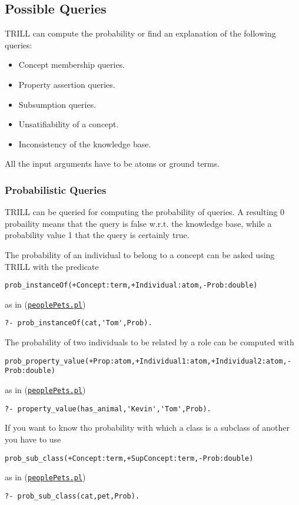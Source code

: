 \subsection{Possible Queries}
\label{queries}

TRILL can compute the probability or find an explanation of the following queries:
\begin{itemize}
  \item Concept membership queries.
  \item Property assertion queries.
  \item Subsumption queries.
  \item Unsatifiability of a concept.
  \item Inconsistency of the knowledge base.
\end{itemize}
All the input arguments have to be atoms or ground terms.

\subsubsection{Probabilistic Queries}
TRILL can be queried for computing the probability of queries. A resulting 0 probaility means that the query is false w.r.t. the knowledge base, while a probability value 1 that the query is certainly true.

The probability of an individual to belong to a concept can be asked using TRILL with the predicate
\begin{verbatim}
prob_instanceOf(+Concept:term,+Individual:atom,-Prob:double)
\end{verbatim}
as in (\href{http://trill.lamping.unife.it/example/trill/peoplePets.pl}{\texttt{peoplePets.pl}})
\begin{verbatim}
?- prob_instanceOf(cat,'Tom',Prob).
\end{verbatim}

The probability of two individuals to be related by a role can be computed with
\begin{verbatim}
prob_property_value(+Prop:atom,+Individual1:atom,+Individual2:atom,-Prob:double)
\end{verbatim}
as in (\href{http://trill.lamping.unife.it/example/trill/peoplePets.pl}{\texttt{peoplePets.pl}})
\begin{verbatim}
?- property_value(has_animal,'Kevin','Tom',Prob).
\end{verbatim}

If you want to know tho probability with which a class is a subclass of another you have to use
\begin{verbatim}
prob_sub_class(+Concept:term,+SupConcept:term,-Prob:double)
\end{verbatim}
as in (\href{http://trill.lamping.unife.it/example/trill/peoplePets.pl}{\texttt{peoplePets.pl}})
\begin{verbatim}
?- prob_sub_class(cat,pet,Prob).
\end{verbatim}

